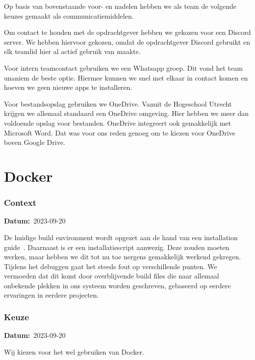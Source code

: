 \documentclass[a4paper]{report}
\newcommand{\teambox}{
  \begin{tcolorbox}[hbox, colback=blue!5!white,colframe=blue!75!black,
    left=.1mm, right=.1mm, top=.1mm, bottom=.1mm, fontupper=\scriptsize\sffamily]
    Team Keuze
  \end{tcolorbox}
}
\newcommand{\teamchoice}[1]{
  \section[ #1 ]{#1~\mbox{\raisebox{-2.5pt}{\teambox}}}
}
\newcommand{\timestamp}[1]{
  \mbox{\scriptsize \textbf{Datum:} #1} \smallbreak
}
\begin{document}
Op basis van bovenstaande voor- en nadelen hebben we als team de volgende keuzes gemaakt als communicatiemiddelen.
\par\smallskip
Om contact te houden met de opdrachtgever hebben we gekozen voor een Discord server.
We hebben hiervoor gekozen, omdat de opdrachtgever Discord gebruikt en elk teamlid hier al actief gebruik van maakte.
\par \smallskip 
Voor intern teamcontact gebruiken we een Whatsapp groep. Dit vond het team unaniem de beste optie. Hiermee kunnen we snel met elkaar in contact komen en hoeven we geen nieuwe apps te installeren. 
\par \smallskip
Voor bestandsopslag gebruiken we OneDrive. Vanuit de Hogeschool Utrecht krijgen we allemaal standaard een OneDrive omgeving.
Hier hebben we meer dan voldoende opslag voor bestanden. OneDrive integreert ook gemakkelijk met Microsoft Word. 
Dat was voor ons reden genoeg om te kiezen voor OneDrive boven Google Drive.

\teamchoice{Docker}
\label{sec:dockerchoice}
\subsubsection{Context}
\timestamp{2023-09-20}
De huidige build environment wordt opgezet aan de hand van een installation guide~\cite{fairphonegithub}.
Daarnaast is er een installatiescript aanwezig.
Deze zouden moeten werken, maar hebben we dit tot nu toe nergens gemakkelijk werkend gekregen.
Tijdens het debuggen gaat het steeds fout op verschillende punten. 
We vermoeden dat dit komt door overblijvende build files die naar allemaal onbekende plekken in ons systeem worden geschreven, gebaseerd op eerdere ervaringen in eerdere projecten.

\subsubsection{Keuze}
\timestamp{2023-09-20}
Wij kiezen voor het wel gebruiken van Docker.
\end{document}

